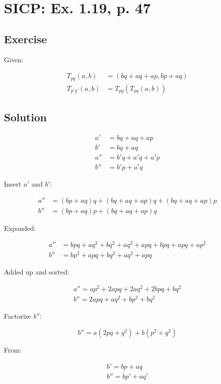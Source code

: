 \documentclass[a4paper]{scrartcl}
\begin{document}
\setlength\parindent{0pt}

\section*{SICP: Ex. 1.19, p. 47}

\subsection*{Exercise}

Given:

\begin{align}
T_{pq}(a,b) & = (bq+aq+ap, bp+aq) \\
T_{p'q'}(a,b) & = T_{pq}(T_{pq}(a,b))
\end{align}

\subsection*{Solution}

\begin{align}
a' & = bq + aq + ap \\
b' & = bq + aq \\
a'' & = b'q + a'q + a'p \\
b'' & = b'p  + a'q
\end{align}

Insert $a'$ and $b'$:

\begin{align}
a'' & = (bp+aq)q + (bq+aq+ap)q + (bq+aq+ap)p \\
b'' & = (bp+aq)p + (bq+aq+ap)q
\end{align}

Expanded:

\begin{align}
a'' & = bpq + aq^2 + bq^2 + aq^2 + apq + bpq + apq + ap^2 \\
b'' & = bp^2 + apq + bq^2 + aq^2 + apq
\end{align}

Added up and sorted:

\begin{align}
a'' = ap^2 + 2apq + 2aq^2 + 2bpq + bq^2 \\
b'' = 2apq + aq^2 + bp^2 + bq^2
\end{align}

Factorize $b''$:

$$ b'' = a(2pq + q^2) + b(p^2 + q^2) $$

From:

\begin{align}
b' = bp + aq \\
b'' = bp' + aq'
\end{align}
\end{document}
